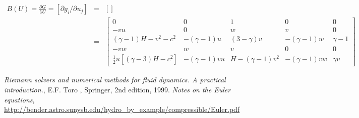 \documentclass{article}
\begin{document}
\begin{eqnarray}
  B(U) = \frac{\partial G}{\partial U} = \left[ \partial g_i/\partial u_j \right] & = & \left[
     \right]\\
  & = & \left[
    \begin{array}{ccccc}
      0 & 0 & 1 & 0 & 0\\
      -v u & 0 & w & v & 0\\
      (\gamma-1)H- v^2-c^2 & -(\gamma-1)u & (3-\gamma) v & -(\gamma-1)w &  \gamma-1\\
      -v w & w & v & 0 & 0\\
      \frac{1}{2} u [(\gamma-3)H-c^2] & -(\gamma-1)vu & H-(\gamma-1)v^2 & -(\gamma-1)vw & \gamma v
    \end{array}
  \right]
\end{eqnarray}


\begin{thebibliography}{9}
 \emph{Riemann solvers and numerical methods for fluid dynamics. A practical introduction.}, E.F. Toro , Springer, 2nd edition, 1999.
 \emph{Notes on the Euler equations}, \url{http://bender.astro.sunysb.edu/hydro_by_example/compressible/Euler.pdf}
\end{thebibliography}
\end{document}
